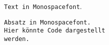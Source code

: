 \verb|Text in Monospacefont|.

\begin{verbatim}
Absatz in Monospacefont.
Hier könnte Code dargestellt
werden.
\end{verbatim}
